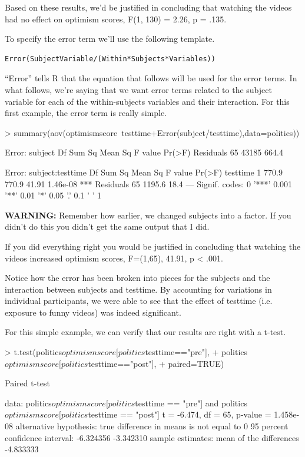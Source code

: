 \documentclass[12pt]{article}
\begin{document}
Based on these results, we'd be justified in concluding that watching the videos
had no effect on optimism scores, F(1, 130) = 2.26, p = .135.

To specify the error term we'll use the following template.

\begin{verbatim}
Error(SubjectVariable/(Within*Subjects*Variables))
\end{verbatim}

``Error'' tells R that the equation that follows will be used for the error terms.
In what follows, we're saying that we want error terms related to the subject variable
for each of the within-subjects variables and their interaction. For this first
example, the error term is really simple.

\begin{Schunk}
\begin{Sinput}
> summary(aov(optimismscore~testtime+Error(subject/testtime),data=politics))
\end{Sinput}
\begin{Soutput}
Error: subject
          Df Sum Sq Mean Sq F value Pr(>F)
Residuals 65  43185   664.4               

Error: subject:testtime
          Df Sum Sq Mean Sq F value   Pr(>F)    
testtime   1  770.9   770.9   41.91 1.46e-08 ***
Residuals 65 1195.6    18.4                     
---
Signif. codes:  
0 '***' 0.001 '**' 0.01 '*' 0.05 '.' 0.1 ' ' 1
\end{Soutput}
\end{Schunk}

\textbf{WARNING:} Remember how earlier, we changed subjects into a factor. If you didn't
do this you didn't get the same output that I did.

If you did everything right you would be justified in concluding that watching
the videos increased optimism scores, F=(1,65), 41.91, p < .001.

Notice how the error has been broken into pieces for the subjects and the interaction
between subjects and testtime. By accounting for variations in individual participants,
we were able to see that the effect of testtime (i.e. exposure to funny videos) was
indeed significant.

For this simple example, we can verify that our results are right with a t-test.

\begin{Schunk}
\begin{Sinput}
> t.test(politics$optimismscore[politics$testtime=="pre"],
+        politics$optimismscore[politics$testtime=="post"],
+        paired=TRUE)
\end{Sinput}
\begin{Soutput}
	Paired t-test

data:  politics$optimismscore[politics$testtime == "pre"] and politics$optimismscore[politics$testtime == "post"]
t = -6.474, df = 65, p-value = 1.458e-08
alternative hypothesis: true difference in means is not equal to 0
95 percent confidence interval:
 -6.324356 -3.342310
sample estimates:
mean of the differences 
              -4.833333 
\end{Soutput}
\end{Schunk}
\end{document}
